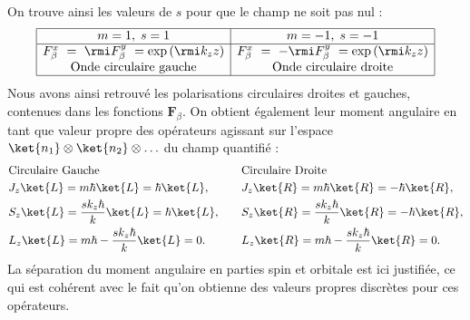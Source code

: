 On trouve ainsi les valeurs de $s$ pour que le champ ne soit pas nul :
\[
\begin{array}{|c|c|}
		\hline
		m = 1,\;s = 1&m = -1,\;s = -1\\
		\hline
		F_{\beta}^x ~= ~\rmi F_{\beta}^y ~= \exp{(\rmi k_zz)} & F_{\beta}^x ~= ~-\rmi F_{\beta}^y ~= \exp{(\rmi k_zz)}\\
		\text{Onde circulaire gauche} & \text{Onde circulaire droite}\\
		\hline
\end{array}\]
Nous avons ainsi retrouvé les polarisations circulaires droites et gauches, contenues dans les fonctions $\bm{F}_{\beta}$. On obtient également leur moment angulaire en tant que valeur propre des opérateurs agissant sur l'espace $\ket{n_1}\otimes\ket{n_2}\otimes\ldots$ du champ quantifié :
\begin{equation*}
\begin{aligned}[c]
&\text{Circulaire Gauche}\\
&J_z\ket{L} = m\hbar\ket{L} = \hbar\ket{L},\\
&S_z\ket{L} = \frac{sk_z\hbar}{k}\ket{L} = \hbar\ket{L},\\
&L_z\ket{L} = m\hbar-\frac{sk_z\hbar}{k}\ket{L} = 0.
\end{aligned}
\qquad
\begin{aligned}[c]
&\text{Circulaire Droite}\\
&J_z\ket{R} = m\hbar\ket{R} = -\hbar\ket{R},\\
&S_z\ket{R} = \frac{sk_z\hbar}{k}\ket{R} = -\hbar\ket{R},\\
&L_z\ket{R} = m\hbar-\frac{sk_z\hbar}{k}\ket{R} = 0.
\end{aligned}
\end{equation*}
La séparation du moment angulaire en parties spin et orbitale est ici justifiée, ce qui est cohérent avec le fait qu'on obtienne des valeurs propres discrètes pour ces opérateurs.

